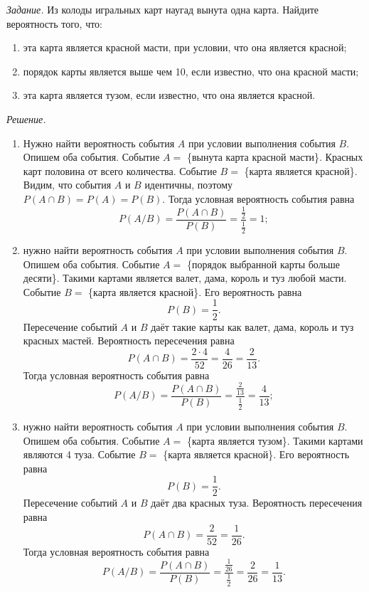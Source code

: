 \textit{Задание.} Из колоды игральных карт наугад вынута одна карта.
Найдите вероятность того, что:
\begin{enumerate}[label=\alph*)]
\item эта карта является красной масти, при условии, что она является красной;
\item порядок карты является выше чем 10, если известно, что она красной масти;
\item эта карта является тузом, если известно, что она является красной.
\end{enumerate}

\textit{Решение.} 
\begin{enumerate}[label=\alph*)]
\item Нужно найти вероятность события $A$ при условии выполнения события $B$.
Опишем оба события.
Событие $A =$ \{вынута карта красной масти\}.
Красных карт половина от всего количества.
Событие $B =$ \{карта является красной\}.
Видим, что события $A$ и $B$ идентичны, поэтому $P \left( A \cap B \right) = P \left( A \right) = P \left( B \right)$.
Тогда условная вероятность события равна
$$P \left( A/B \right) =
\frac{P \left( A \cap B \right)}{P \left( B \right) } =
\frac{ \frac{1}{2} }{ \frac{1}{2} } =
1;$$
\item нужно найти вероятность события $A$ при условии выполнения события $B$.
Опишем оба события.
Событие $A =$ \{порядок выбранной карты больше десяти\}.
Такими картами является валет, дама, король и туз любой масти.
Событие $B =$ \{карта является красной\}.
Его вероятность равна
$$P \left( B \right) =
\frac{1}{2}.$$
Пересечение событий $A$ и $B$ даёт такие карты как валет, дама, король и туз красных мастей.
Вероятность пересечения равна
$$P \left( A \cap B \right) =
\frac{2 \cdot 4}{52} =
\frac{4}{26} =
\frac{2}{13}.$$
Тогда условная вероятность события равна
$$P \left( A/B \right) =
\frac{P \left( A \cap B \right)}{P \left( B \right) } =
\frac{ \frac{2}{13} }{ \frac{1}{2} } =
\frac{4}{13};$$
\item нужно найти вероятность события $A$ при условии выполнения события $B$.
Опишем оба события.
Событие $A =$ \{карта является тузом\}.
Такими картами являются 4 туза.
Событие $B =$ \{карта является красной\}.
Его вероятность равна
$$P \left( B \right) =
\frac{1}{2}.$$
Пересечение событий $A$ и $B$ даёт два красных туза.
Вероятность пересечения равна
$$P \left( A \cap B \right) =
\frac{2}{52} =
\frac{1}{26}.$$
Тогда условная вероятность события равна
$$P \left( A/B \right) =
\frac{P \left( A \cap B \right)}{P \left( B \right) } =
\frac{ \frac{1}{26} }{ \frac{1}{2} } =
\frac{2}{26} =
\frac{1}{13}.$$
\end{enumerate}

